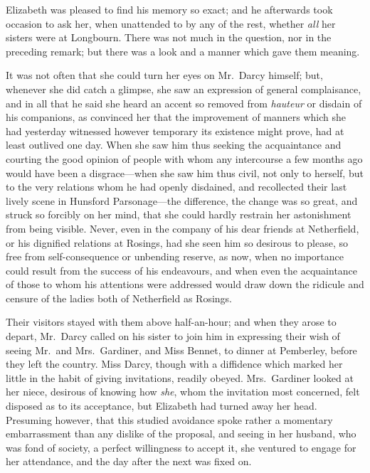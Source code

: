 \documentclass[12pt,english]{book}
\begin{document}
Elizabeth was pleased to find his memory so exact; and he afterwards
took occasion to ask her, when unattended to by any of the rest, whether
\textit{all} her sisters were at Longbourn. There was not much in
the question, nor in the preceding remark; but there was a look and
a manner which gave them meaning.

It was not often that she could turn her eyes on Mr.\ Darcy himself;
but, whenever she did catch a glimpse, she saw an expression of general
complaisance, and in all that he said she heard an accent so removed
from \emph{hauteur} or disdain of his companions, as convinced her
that the improvement of manners which she had yesterday witnessed
however temporary its existence might prove, had at least outlived
one day. When she saw him thus seeking the acquaintance and courting
the good opinion of people with whom any intercourse a few months
ago would have been a disgrace\mbox{---}when she saw him thus civil,
not only to herself, but to the very relations whom he had openly
disdained, and recollected their last lively scene in Hunsford Parsonage\mbox{---}the
difference, the change was so great, and struck so forcibly on her
mind, that she could hardly restrain her astonishment from being visible.
Never, even in the company of his dear friends at Netherfield, or
his dignified relations at Rosings, had she seen him so desirous to
please, so free from self-consequence or unbending reserve, as now,
when no importance could result from the success of his endeavours,
and when even the acquaintance of those to whom his attentions were
addressed would draw down the ridicule and censure of the ladies both
of Netherfield as Rosings.

Their visitors stayed with them above half-an-hour; and when they
arose to depart, Mr.\ Darcy called on his sister to join him in expressing
their wish of seeing Mr.\ and Mrs.\ Gardiner, and Miss Bennet, to
dinner at Pemberley, before they left the country. Miss Darcy, though
with a diffidence which marked her little in the habit of giving invitations,
readily obeyed. Mrs.\ Gardiner looked at her niece, desirous of knowing
how \textit{she}, whom the invitation most concerned, felt disposed
as to its acceptance, but Elizabeth had turned away her head. Presuming
however, that this studied avoidance spoke rather a momentary embarrassment
than any dislike of the proposal, and seeing in her husband, who was
fond of society, a perfect willingness to accept it, she ventured
to engage for her attendance, and the day after the next was fixed
on.
\end{document}

